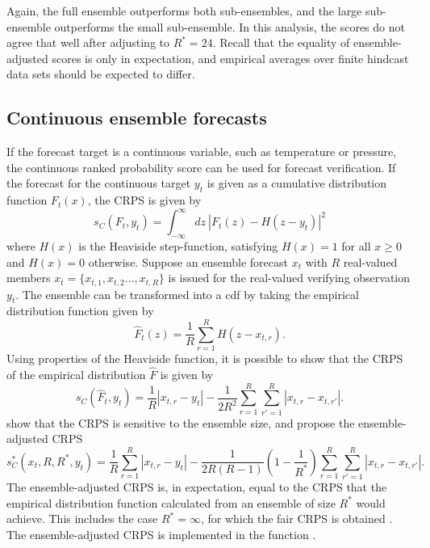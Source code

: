 \documentclass[article]{jss}\usepackage{graphicx, color}
\begin{document}
Again, the full ensemble outperforms both sub-ensembles, and the large sub-ensemble outperforms the small sub-ensemble.
In this analysis, the scores do not agree that well after adjusting to $R^* = 24$.
Recall that the equality of ensemble-adjusted scores is only in expectation, and empirical averages over finite hindcast data sets should be expected to differ.

\subsection{Continuous ensemble forecasts}


If the forecast target is a continuous variable, such as temperature or pressure, the continuous ranked probability score \citep{matheson1976scoring} can be used for forecast verification.
If the forecast for the continuous target $y_t$ is given as a cumulative distribution function $F_t(x)$, the CRPS is given by 
%
\begin{equation}
s_{C}(F_t, y_t) = \int_{-\infty}^\infty dz\ \left|F_t(z) - H(z-y_t)\right|^2
\label{eq:crps}
\end{equation}
%
where $H(x)$ is the Heaviside step-function, satisfying $H(x)=1$ for all $x\ge 0$ and $H(x)=0$ otherwise.
Suppose an ensemble forecast $x_t$ with $R$ real-valued members $x_t = \{x_{t,1}, x_{t,2} \dots, x_{t,R}\}$ is issued for the real-valued verifying observation $y_t$.
The ensemble can be transformed into a cdf by taking the empirical distribution function given by 
%
\begin{equation}
\hat{F}_t(z) = \frac{1}{R} \sum_{r=1}^{R} H(z - x_{t,r}).
\end{equation}
%
Using properties of the Heaviside function, it is possible to show that the CRPS of the empirical distribution $\hat{F}$ is given by
%
\begin{equation}
s_{C}(\hat{F}_t, y_t) = \frac{1}{R}|x_{t,r}-y_t| - \frac{1}{2R^2} \sum_{r=1}^R \sum_{r'=1}^R |x_{t,r}-x_{t,r'}|.
\end{equation}
%
\citet{fricker2013three} show that the CRPS is sensitive to the ensemble size, and propose the ensemble-adjusted CRPS
%
\begin{equation}
s_{C}^*(x_t, R, R^*, y_t) = \frac{1}{R}\sum_{r=1}^R |x_{t,r} - y_t| - \frac{1}{2R(R-1)}\left(1-\frac{1}{R^*}\right) \sum_{r=1}^R\sum_{r'=1}^R |x_{t,r}-x_{t,r'}|.
\end{equation}
%
The ensemble-adjusted CRPS is, in expectation, equal to the CRPS that the empirical distribution function calculated from an ensemble of size $R^*$ would achieve.
This includes the case $R^*=\infty$, for which the fair CRPS is obtained \citep{fricker2013three}.
The ensemble-adjusted CRPS is implemented in the  function .
\end{document}
